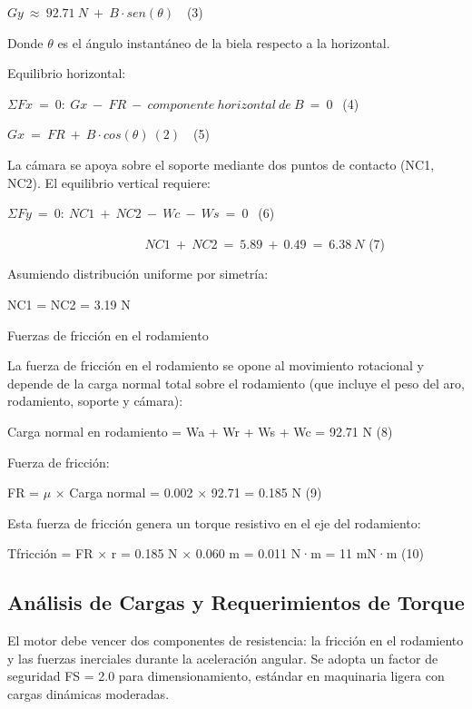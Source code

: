 \documentclass[12pt,a4paper,oneside]{report}
\begin{document}
\(Gy\  \approx \ 92.71\ N\  + \ B \cdot sen(\theta)\ \ \ \) (3)

Donde \ensuremath{\theta} es el ángulo instantáneo de la biela respecto a la horizontal.

Equilibrio horizontal:

\(\Sigma Fx\  = \ 0:\ Gx\  - \ FR\  - \ componente\ horizontal\ de\ B\  = \ 0\ \ \) (4)

\(Gx\  = \ FR\  + \ B \cdot cos(\theta)\ (2)\ \ \ \) (5)

La cámara se apoya sobre el soporte mediante dos puntos de contacto (NC1, NC2). El equilibrio vertical requiere:

\(\Sigma Fy\  = \ 0:\ NC1\  + \ NC2\  - \ Wc\  - \ Ws\  = \ 0\ \ \) (6)

\(\ \ \ \ \ \ \ \ \ \ \ \ \ \ \ \ \ \ \ \ \ \ \ \ \ \ \ \ \ \ \ \ \ \ \ \ \ \ \ \ \ \ \ \ \ \ \ \ \ NC1\  + \ NC2\  = \ 5.89\  + \ 0.49\  = \ 6.38\ N\) (7)

Asumiendo distribución uniforme por simetría:

NC1 = NC2 = 3.19 N

Fuerzas de fricción en el rodamiento

La fuerza de fricción en el rodamiento se opone al movimiento rotacional y depende de la carga normal total sobre el rodamiento (que incluye el peso del aro, rodamiento, soporte y cámara):

Carga normal en rodamiento = Wa + Wr + Ws + Wc = 92.71 N (8)

Fuerza de fricción:

FR = \ensuremath{\mu} \ensuremath{\times} Carga normal = 0.002 \ensuremath{\times} 92.71 = 0.185 N (9)

Esta fuerza de fricción genera un torque resistivo en el eje del rodamiento:

Tfricción = FR \ensuremath{\times} r = 0.185 N \ensuremath{\times} 0.060 m = 0.011 N·m = 11 mN·m (10)

\subsection{Análisis de Cargas y Requerimientos de Torque}\label{anuxe1lisis-de-cargas-y-requerimientos-de-torque}

El motor debe vencer dos componentes de resistencia: la fricción en el rodamiento y las fuerzas inerciales durante la aceleración angular. Se adopta un factor de seguridad FS = 2.0 para dimensionamiento, estándar en maquinaria ligera con cargas dinámicas moderadas.
\end{document}
